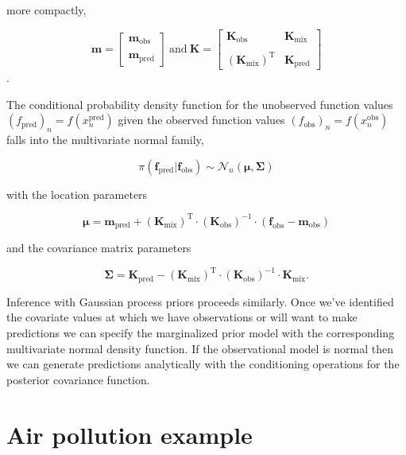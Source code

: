 \documentclass[a4paper, 10pt, fleqn]{article}
\begin{document}
\begin{flushleft}
   more compactly,

   \vspace{1em}

   $$\mathbf{m} = 
   \begin{bmatrix}
      \mathbf{m}_{\text{obs}} \\
      \\
      \mathbf{m}_{\text{pred}}
   \end{bmatrix}  
   \: 
   \text{and}
   \:
   \mathbf{K} = 
   \begin{bmatrix}
      \mathbf{K}_{\text{obs}} & \mathbf{K}_{\text{mix}} \\
      \\
      (\mathbf{K}_{\text{mix}})^{\text{T}} & \mathbf{K}_{\text{pred}}
   \end{bmatrix}$$.

   \vspace{1em}

   The conditional probability density function for the unobserved function values $(f_{\text{pred}})_{n} = f(x_{n}^{\text{pred}})$ given the observed function values  $(f_{\text{obs}})_{n} = f(x_{n}^{\text{obs}})$ falls into the multivariate normal family,

   $$\pi(\mathbf{f}_{\text{pred}} | \mathbf{f}_{\text{obs}}) \sim \mathcal{N}_{n}(\boldsymbol{\mu}, \boldsymbol{\Sigma})$$

   with the location parameters 

   $$\boldsymbol{\mu} = \mathbf{m}_{\text{pred}} + (\mathbf{K}_{\text{mix}})^{\text{T}} \cdot (\mathbf{K}_{\text{obs}})^{-1} \cdot (\mathbf{f}_{\text{obs}} - \mathbf{m}_{\text{obs}}) $$

   and the covariance matrix parameters

   $$\boldsymbol{\Sigma} = \mathbf{K}_{\text{pred}} - (\mathbf{K}_{\text{mix}})^{\text{T}} \cdot (\mathbf{K}_{\text{obs}})^{-1} \cdot \mathbf{K}_{\text{mix}}.$$

   Inference with Gaussian process priors proceeds similarly. Once we've identified the covariate values at which we have observations or will want to make predictions we can specify the marginalized prior model with the corresponding multivariate normal density function. If the observational model is normal then we can generate predictions analytically with the conditioning operations for the posterior covariance function.

   \section*{Air pollution example}

\end{flushleft}
\end{document}
